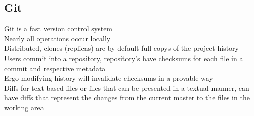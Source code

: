 \subsection{Git}
\label{sec:Git}
Git is a fast version control system\\
Nearly all operations occur locally\\
Distributed, clones (replicas) are by default full copys of the project history\\
Users commit into a repository, repository’s have checksums for each file in a commit and respective metadata\\
Ergo modifying history will invalidate checksums in a provable way\\

Diffs for text based files or files that can be presented in a textual manner, can have diffs that represent the changes from the current master to the files in the working area\\
